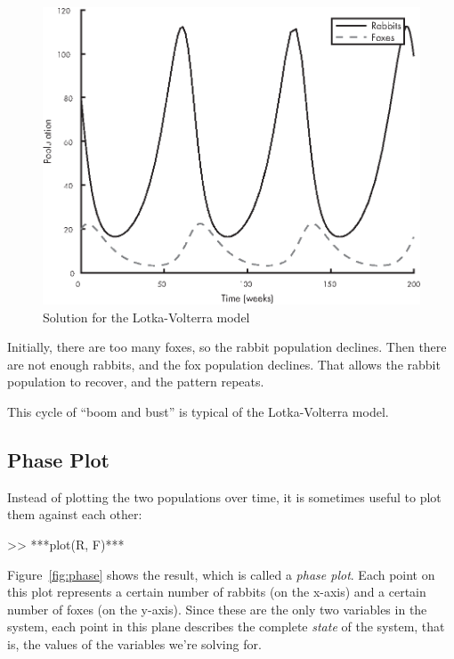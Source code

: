 \begin{figure}[H]
\includegraphics{book/images/figure10_01_new.eps}
\caption{Solution for the Lotka-Volterra model}
\label{fig:lotka}
\end{figure}


Initially, there are too many foxes, so the rabbit population declines.  Then there are not enough rabbits, and the fox population declines.  That allows the rabbit population to recover, and the pattern repeats.

This cycle of ``boom and bust'' is typical of the Lotka-Volterra model.


\subsection{Phase Plot}

Instead of plotting the two populations over time, it is sometimes useful to plot them against each other:

\begin{code}
>> ***plot(R, F)***
\end{code}

Figure~\ref{fig:phase} shows the result, which is called a \emph{phase plot}.
Each point on this plot represents a certain number of rabbits (on the
x-axis) and a certain number of foxes (on the y-axis).
Since these are the only two variables in the system, each point in
this plane describes the complete \emph{state} of the system, that is, the values of
the variables we're solving for.

